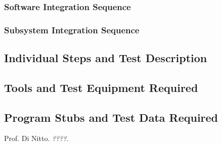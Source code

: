 \documentclass[a4paper, 11pt]{article}
\begin{document}
\subsubsection{Software Integration Sequence} 
\label{ssub:software_integration_sequence}

\subsubsection{Subsystem Integration Sequence} 
\label{ssub:subsystem_integration_sequence}

\subsection{Individual Steps and Test Description} 
\label{sub:individual_steps_and_test_description}

\subsection{Tools and Test Equipment Required} 
\label{sub:tools_and_test_equipment_required}

\subsection{Program Stubs and Test Data Required} 
\label{sub:program_stubs_and_test_data_required}


\appendix

\clearpage
{}

\begin{thebibliography}{9}
 Prof. Di Nitto.
\emph{????}.
\end{thebibliography}

\vfill

\end{document}
